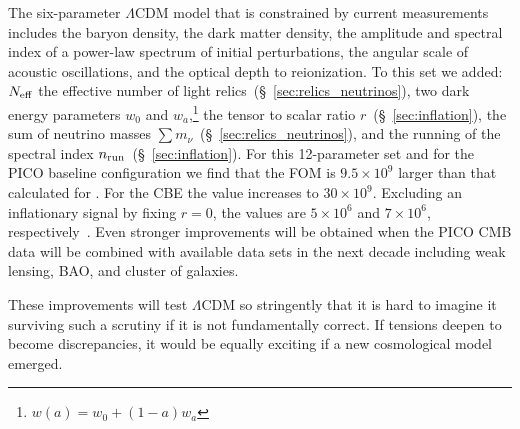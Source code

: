 \documentclass[PICOReport.tex]{subfiles}
\begin{document}
The six-parameter $\Lambda$CDM model that is constrained by current measurements includes the baryon density, the dark matter density, the amplitude and spectral index of a power-law spectrum of initial perturbations, the angular scale of acoustic oscillations, and the optical depth to reionization. To this set we added: $N_{\rm eff}$ the effective number of light relics~(\S~\ref{sec:relics_neutrinos}), two dark energy parameters $w_{0}$ and $w_{a}$,\footnote{$w(a) = w_{0} + (1-a)w_{a}$} the tensor to scalar ratio $r$~(\S~\ref{sec:inflation}), the sum of neutrino masses $\sum m_{\nu}$~(\S~\ref{sec:relics_neutrinos}), and the running of the spectral index $n_{\rm run}$~(\S~\ref{sec:inflation}). For this 12-parameter set and for the PICO baseline configuration we find that the FOM is $9.5\times10^{9}$ larger than that calculated for \planck . For the CBE the value increases to $30\times10^{9}$. Excluding an inflationary signal by fixing $r=0$, the values are $5\times10^{6}$ and $7\times10^{6}$, respectively~\citep{picowebsite}.  Even stronger improvements will be obtained when the PICO CMB data will be combined with available data sets in the next decade including weak lensing, BAO, and cluster of galaxies. 
 
These improvements will test $\Lambda$CDM so stringently that it is hard to imagine it surviving such a scrutiny if it is not fundamentally correct. If tensions deepen to become discrepancies, it would be equally exciting if a new cosmological model emerged. 

\end{document}
